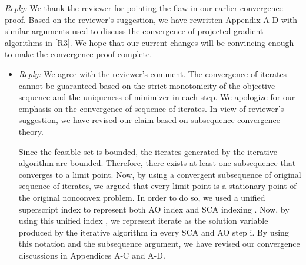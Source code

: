 
\vspace{1eM}
\underline{\textit{Reply:}} We thank the reviewer for pointing the flaw in our earlier convergence proof. Based on the reviewer's suggestion, we have rewritten Appendix A-D with similar arguments used to discuss the convergence of projected gradient algorithms in [R3]. We hope that our current changes will be convincing enough to make the convergence proof complete.

\begin{itemize}
	
	\item {}

	\vspace{1eM}	
	\underline{\textit{Reply:}} We agree with the reviewer's comment. The convergence of iterates cannot be guaranteed based on the strict monotonicity of the objective sequence and the uniqueness of minimizer in each step. We apologize for our emphasis on the convergence of sequence of iterates. In view of reviewer's suggestion, we have revised our claim based on subsequence convergence theory. 
		
	Since the feasible set is bounded, the iterates generated by the iterative algorithm are bounded. Therefore, there exists at least one subsequence that converges to a limit point. Now, by using a convergent subsequence of original sequence of iterates, we argued that every limit point is a stationary point of the original nonconvex problem. In order to do so, we used a unified superscript index  to represent both \ac{AO} index  and \ac{SCA} indexing . Now, by using this unified index , we represent iterate  as the solution variable produced by the iterative algorithm in every \ac{SCA}  and \ac{AO} step {i}. By using this notation and the subsequence argument, we have revised our convergence discussions in Appendices A-C and A-D. 
		

\end{itemize}
